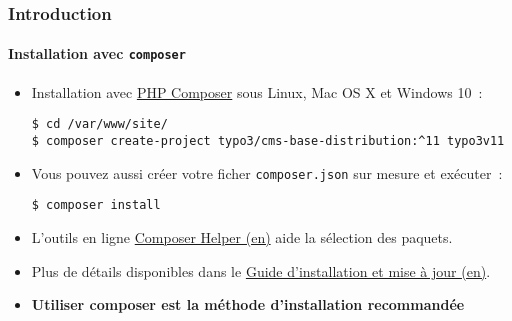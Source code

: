 %

\begin{frame}[fragile]
	\frametitle{Introduction}
	\framesubtitle{Installation avec \texttt{composer}}


	\begin{itemize}
		\item Installation avec \href{https://getcomposer.org}{PHP Composer} sous Linux, Mac OS X et Windows 10~:
\begin{lstlisting}
$ cd /var/www/site/
$ composer create-project typo3/cms-base-distribution:^11 typo3v11
\end{lstlisting}

		\item Vous pouvez aussi créer votre ficher \texttt{composer.json} sur mesure
			et exécuter~:
\begin{lstlisting}
$ composer install
\end{lstlisting}

		\item L'outils en ligne \href{https://get.typo3.org/misc/composer/helper}{Composer Helper (en)}
			aide la sélection des paquets.

		\item Plus de détails disponibles dans le
			\href{https://docs.typo3.org/m/typo3/guide-installation/master/en-us/}{Guide d'installation et mise à jour (en)}.

		\item \textbf{Utiliser composer est la méthode d'installation recommandée}

	\end{itemize}
\end{frame}

